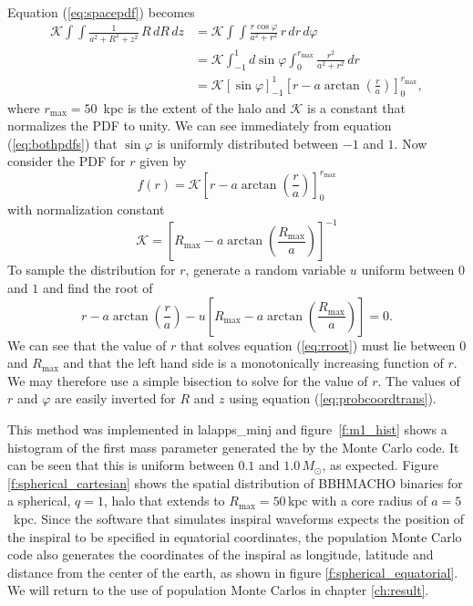 Equation (\ref{eq:spacepdf}) becomes
\begin{equation}
\begin{split}
\mathcal{K} \int\int \frac{1}{a^2 + R^2 + z^2}\,R\, dR\, dz 
&= \mathcal{K} \int\int \frac{r\cos\varphi}{a^2+r^2}\,r\, dr \, d\varphi \\
&= \mathcal{K} \int_{-1}^{1} d\sin\varphi \int_0^{r_{\mathrm{max}}} \frac{r^2}{a^2+r^2}\, dr \\
&= \mathcal{K} \left[\sin\varphi\right]_{-1}^1 \left[r -
a\arctan\left(\frac{r}{a}\right)\right]_0^{r_{\mathrm{max}}},
\end{split}
\label{eq:bothpdfs}
\end{equation}
where $r_\mathrm{max} = 50$~kpc is the extent of the halo and $\mathcal{K}$ is
a constant that normalizes the PDF to unity. We can see immediately from
equation (\ref{eq:bothpdfs}) that $\sin\varphi$ is uniformly
distributed between $-1$ and $1$. Now consider the PDF for $r$ given by
\begin{equation}
f(r) = \mathcal{K} \left[r - a\arctan\left(\frac{r}{a}\right)\right]_0^{r_{\mathrm{max}}}
\end{equation}
with normalization constant
\begin{equation}
\mathcal{K} = 
\left[R_\mathrm{max} -
a\arctan\left(\frac{R_\mathrm{max}}{a}\right)\right]^{-1}
\end{equation}
To sample the distribution for $r$, generate a random variable $u$
uniform between $0$ and $1$ and find the root of
\begin{equation}
r - a\arctan\left(\frac{r}{a}\right) - u \left[R_\mathrm{max} -
a\arctan\left(\frac{R_\mathrm{max}}{a}\right)\right] = 0.
\label{eq:rroot}
\end{equation}
We can see that the value of $r$ that solves equation (\ref{eq:rroot}) must
lie between $0$ and $R_\mathrm{max}$ and that the left hand side is a
monotonically increasing function of $r$. We may therefore use a simple 
bisection to solve for the value of $r$. The values of $r$
and $\varphi$ are easily inverted for $R$ and $z$ using equation
(\ref{eq:probcoordtrans}). 

This method was implemented in lalapps\_minj and figure~\ref{f:m1_hist} shows
a histogram of the first mass parameter generated the by the Monte Carlo code.
It can be seen that this is uniform between $0.1$ and $1.0\,M_\odot$, as
expected. Figure \ref{f:spherical_cartesian} shows the spatial distribution
of BBHMACHO binaries for a spherical, $q=1$, halo that extends to
$R_\mathrm{max} = 50\,\mathrm{kpc}$ with a core radius of $a = 5$~kpc.  Since
the software that simulates inspiral waveforms expects the position of the
inspiral to be specified in equatorial coordinates, the population Monte Carlo
code also generates the coordinates of the inspiral as longitude, latitude and
distance from the center of the earth, as shown in figure
\ref{f:spherical_equatorial}.  We will return to the use of population Monte
Carlos in chapter \ref{ch:result}.

